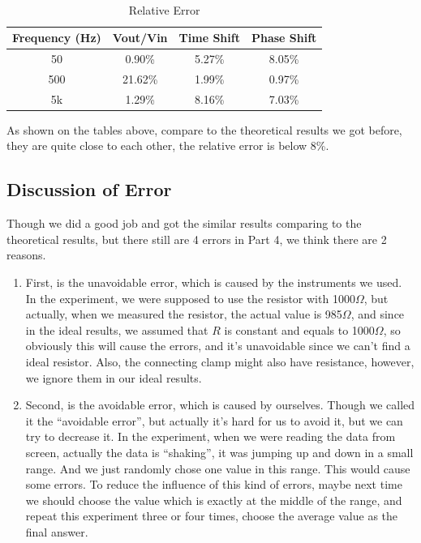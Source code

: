 \documentclass[12pt]{article}
\begin{document}
\qquad \\
\begin{table}[H]
\centering
\begin{tabular}{|c|c|c|c|}
\hline
Frequency (Hz) & Vout/Vin & Time Shift & Phase Shift \\ \hline
50             &0.90\%          &5.27\%            &8.05\%             \\ \hline
500            &21.62\%          &1.99\%            &0.97\%            \\ \hline
5k             &1.29\%          &8.16\%          &7.03\%            \\ \hline
\end{tabular}
\caption{Relative Error}

\end{table}
As shown on the tables above, compare to the theoretical results we got before, they are quite close to each other, the relative error is below 8\%.
\subsection{Discussion of Error}
Though we did a good job and got the similar results comparing to the theoretical results, but there still are 4 errors in Part 4, we think there are 2 reasons.
\begin{enumerate}
\item First, is the unavoidable error, which is caused by the instruments we used. In the experiment, we were supposed to use the resistor with 1000$\Omega$, but actually, when we measured the resistor, the actual value is 985$\Omega$, and since in the ideal results, we assumed that $R$ is constant and equals to 1000$\Omega$, so obviously this will cause the errors, and it’s unavoidable since we can’t find a ideal resistor. Also, the connecting clamp might also have resistance, however, we ignore them in our ideal results.
\item Second, is the avoidable error, which is caused by ourselves. Though we called it the “avoidable error”, but actually it’s hard for us to avoid it, but we can try to decrease it. In the experiment, when we were reading the data from screen, actually the data is “shaking”, it was jumping up and down in a small range. And we just randomly chose one value in this range. This would cause some errors. To reduce the influence of this kind of errors, maybe next time we should choose the value which is exactly at the middle of the range, and repeat this experiment three or four times, choose the average value as the final answer.
\end{enumerate}
\end{document}
